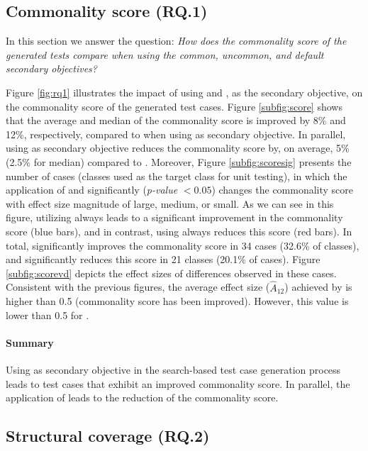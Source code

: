 \subsection{Commonality score (RQ.1)}

In this section we answer the question: \emph{How does the \emph{commonality score} of the generated tests compare when using the \textit{common}, \textit{uncommon}, and \textit{default} secondary objectives?}

Figure \ref{fig:rq1} illustrates the impact of using \com and \ucom, as the secondary objective, on the commonality score of the generated test cases. Figure \ref{subfig:score} shows that the average and median of the commonality score is improved by 8\% and 12\%, respectively, compared to \df when using \com as secondary objective.
In parallel, using \ucom as secondary objective reduces the commonality score by, on average, 5\% (2.5\% for median) compared to \df. Moreover, Figure \ref{subfig:scoresig} presents the number of cases (\ie classes used as the target class for unit testing), in which the application of \com and \ucom significantly (\textit{p-value} $<0.05$) changes the commonality score with effect size magnitude of large, medium, or small. As we can see in this figure, utilizing \com always leads to a significant improvement in the commonality score (blue bars), and in contrast, using \ucom always reduces this score (red bars). In total, \com significantly improves the commonality score in 34 cases (32.6\% of classes), and \ucom significantly reduces this score in 21 classes (20.1\% of cases). Figure \ref{subfig:scorevd} depicts the effect sizes of differences observed in these cases. Consistent with the previous figures, the average effect size ($\widehat{A}_{12}$) achieved by \com is higher than 0.5 (\ie commonality score has been improved). However, this value is lower than 0.5 for \ucom.

\paragraph{Summary} Using \com as secondary objective in the \evosuite search-based test case generation process leads to test cases that exhibit an improved commonality score. In parallel, the application of \ucom leads to the reduction of the commonality score.

\subsection{Structural coverage (RQ.2)}

